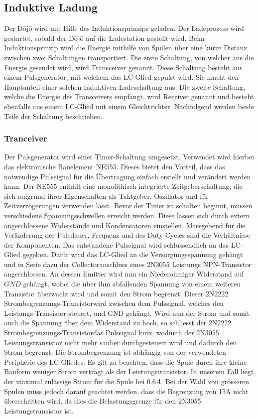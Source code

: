\subsection{Induktive Ladung}\label{sec:energieuebertragung}

Der Dōjō wird mit Hilfe des Induktionsprinzips geladen. Der Ladeprozess wird gestartet, sobald der Dōjō auf die Ladestation gestellt wird. Beim Induktionsprinzip wird die Energie mithilfe von Spulen über eine kurze Distanz zwischen zwei Schaltungen transportiert. Die erste Schaltung, von welcher aus die Energie gesendet wird, wird Transceiver genannt. Diese Schaltung besteht aus einem Pulsgenerator, mit welchem das LC-Glied gepulst wird. Sie macht den Hauptanteil einer solchen Induktiven Ladeschaltung aus. Die zweite Schaltung, welche die Energie des Transceivers empfängt, wird Receiver genannt und besteht ebenfalls aus einem LC-Glied mit einem Gleichtrichter. Nachfolgend werden beide Teile der Schaltung beschrieben.

\subsubsection*{Tranceiver}
Der Pulsgenerator wird einer Timer-Schaltung umgesetzt. Verwendet wird hierbei das elektronische Bauelement NE555. Dieses bietet den Vorteil, dass das notwendige Pulssignal für die Übertragung einfach erstellt und verändert werden kann. Der NE555 enthält eine monolithisch integrierte Zeitgeberschaltung, die sich aufgrund ihrer Eigenschaften als Taktgeber, Oszillator und für Zeitverzögerungen verwenden lässt. Bevor der Timer zu schalten beginnt, müssen verschiedene Spannungsschwellen erreicht werden. Diese lassen sich durch extern angeschlossene Widerstände und Kondensatoren einstellen. Massgebend für die Veränderung der Pulsdauer, Frequenz und des Duty-Cycles sind die Verhältnisse der Komponenten. Das entstandene Pulssignal wird schlussendlich an das LC-Glied gegeben. Dafür wird das LC-Glied an die Versorgungsspannung gehängt und in Serie dazu der Collectoranschluss eines 2N3055 Leistungs NPN-Transistor angeschlossen. An dessen Emitter wird nun ein Niederohmiger Widerstand auf $GND$ gehängt, wobei die über ihm abfallenden Spannung von einem weiteren Transistor überwacht wird und somit den Strom begrenzt. Dieser \glqq 2N2222 Strombegrenzungs-Transistor\grqq wird zwischen dem Pulssignal, welches den Leistungs-Transistor steuert, und GND gehängt. Wird nun der Strom und somit auch die Spannung über dem Widerstand zu hoch, so schliesst der \glqq 2N2222 Strombegrenzungs-Transistor\grqq das Pulssignal kurz, wodurch der 2N3055 Leistungstransistor nicht mehr sauber durchgesteuert wird und dadurch den Strom begrenzt. Die Strombegrenzung ist abhängig von der verwendeten Peripherie des LC-Gliedes. Es gilt zu beachten, dass die Spule durch ihre kleine Bauform weniger Strom verträgt als der Leistungstransistor. In unserem Fall liegt der maximal zulässige Strom für die Spule bei $0.6A$. Bei der Wahl von grösseren Spulen muss jedoch darauf geachtet werden, dass die Begrenzung von 15A nicht überschritten wird, da dies die Belastungsgrenze für den 2N3055 Leistungstransistor ist.
 
